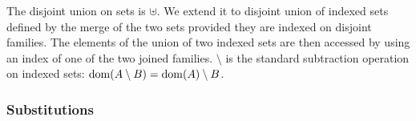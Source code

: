 \documentclass{lmcs}
\begin{document}
The disjoint union on sets is $\uplus$. We extend it to  disjoint union  of indexed 
sets defined by the merge of the 
two sets provided they are indexed on disjoint families.
The elements
of the union of two indexed sets are then accessed by using an index of one of the two
joined families.
$\setminus$ is the standard subtraction operation on indexed sets: $\operatorname{dom}(A\setminus B)=\operatorname{dom}(A)\setminus B$.



\subsubsection*{Substitutions}
\label{def:substitutions}
\end{document}
